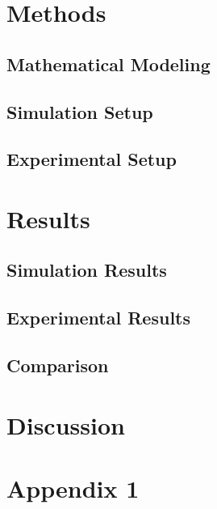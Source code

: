 \documentclass[a4paper,12pt]{article}
\begin{document}
\section{Methods}

    \subsection{Mathematical Modeling}
    
    \subsection{Simulation Setup}
    
    \subsection{Experimental Setup}

\section{Results}

    \subsection{Simulation Results}

    \subsection{Experimental Results}

    \subsection{Comparison}

\section{Discussion}



\hypersetup{urlcolor=black}


\newpage


\appendix

\section{Appendix 1}
\end{document}

